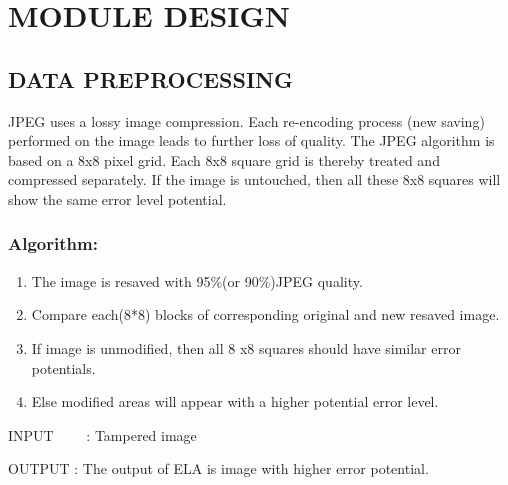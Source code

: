 \section{MODULE DESIGN}
\subsection{DATA PREPROCESSING}
JPEG uses a lossy image compression. Each re-encoding process (new saving) performed on the image leads to further loss of quality. The JPEG algorithm is based on a 8x8 pixel grid. Each 8x8 square grid is thereby treated and compressed separately. If the image is untouched, then all these 8x8 squares will show the same error level potential.  
\subsubsection{Algorithm:} 
\begin{enumerate}
    \item The image is resaved with 95\%(or 90\%)JPEG quality.
    \item Compare each(8*8) blocks of corresponding original and new resaved image. 
\item If image is unmodified, then all 8 x8 squares should have similar error potentials.
\item Else modified areas will appear with a higher potential error level.
\end{enumerate}

INPUT \ \ \ \ : Tampered image

OUTPUT : The output of ELA is image with higher error potential.

